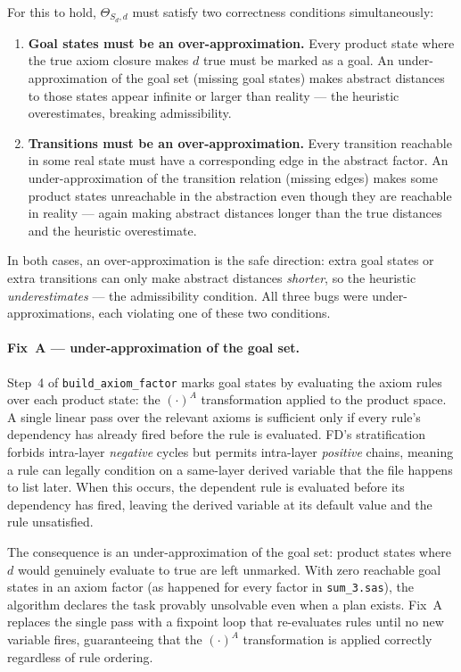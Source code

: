 \documentclass[11pt,a4paper]{article}
\begin{document}
For this to hold, $\Theta_{S_d,d}$ must satisfy two correctness conditions
simultaneously:

\begin{enumerate}
  \item \textbf{Goal states must be an over-approximation.}  Every product
    state where the true axiom closure makes $d$ true must be marked as a
    goal.  An under-approximation of the goal set (missing goal states)
    makes abstract distances to those states appear infinite or larger than
    reality --- the heuristic overestimates, breaking admissibility.

  \item \textbf{Transitions must be an over-approximation.}  Every
    transition reachable in some real state must have a corresponding edge
    in the abstract factor.  An under-approximation of the transition
    relation (missing edges) makes some product states unreachable in the
    abstraction even though they are reachable in reality --- again making
    abstract distances longer than the true distances and the heuristic
    overestimate.
\end{enumerate}

In both cases, an over-approximation is the safe direction: extra goal
states or extra transitions can only make abstract distances \emph{shorter},
so the heuristic \emph{underestimates} --- the admissibility condition.
All three bugs were under-approximations, each violating one of these two
conditions.

\paragraph{Fix~A --- under-approximation of the goal set.}

Step~4 of \texttt{build\_axiom\_factor} marks goal states by evaluating
the axiom rules over each product state: the $(\cdot)^A$ transformation
applied to the product space.  A single linear pass over the relevant
axioms is sufficient only if every rule's dependency has already fired
before the rule is evaluated.  FD's stratification forbids intra-layer
\emph{negative} cycles but permits intra-layer \emph{positive} chains,
meaning a rule can legally condition on a same-layer derived variable
that the file happens to list later.  When this occurs, the dependent
rule is evaluated before its dependency has fired, leaving the derived
variable at its default value and the rule unsatisfied.

The consequence is an under-approximation of the goal set: product
states where $d$ would genuinely evaluate to true are left unmarked.
With zero reachable goal states in an axiom factor (as happened for
every factor in \texttt{sum\_3.sas}), the algorithm declares the task
provably unsolvable even when a plan exists.  Fix~A replaces the single
pass with a fixpoint loop that re-evaluates rules until no new variable
fires, guaranteeing that the $(\cdot)^A$ transformation is applied
correctly regardless of rule ordering.
\end{document}
